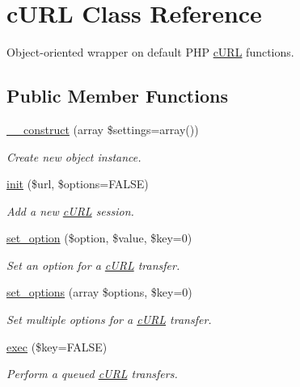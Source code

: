 \hypertarget{a00002}{
\section{cURL Class Reference}
\label{a00002}
}


Object-\/oriented wrapper on default PHP \hyperlink{a00002}{cURL} functions.  


\subsection*{Public Member Functions}
\begin{DoxyCompactItemize}
\item 
\hyperlink{a00002_a58d3c3b3942cba0ec609f3b976df071a}{\_\-\_\-construct} (array \$settings=array())
\begin{DoxyCompactList}\small\item\em Create new object instance. \item\end{DoxyCompactList}\item 
\hyperlink{a00002_aaa612ff5c1295a3f34551c72732a73d9}{init} (\$url, \$options=FALSE)
\begin{DoxyCompactList}\small\item\em Add a new \hyperlink{a00002}{cURL} session. \item\end{DoxyCompactList}\item 
\hyperlink{a00002_a04f65f438657b85a8ade972337bae40a}{set\_\-option} (\$option, \$value, \$key=0)
\begin{DoxyCompactList}\small\item\em Set an option for a \hyperlink{a00002}{cURL} transfer. \item\end{DoxyCompactList}\item 
\hyperlink{a00002_a4a4d54096ca38588538dc6d985a9d770}{set\_\-options} (array \$options, \$key=0)
\begin{DoxyCompactList}\small\item\em Set multiple options for a \hyperlink{a00002}{cURL} transfer. \item\end{DoxyCompactList}\item 
\hyperlink{a00002_a127dd482f013a004d70d80ceb860064a}{exec} (\$key=FALSE)
\begin{DoxyCompactList}\small\item\em Perform a queued \hyperlink{a00002}{cURL} transfers. \item\end{DoxyCompactList}\item 

\end{DoxyCompactItemize}
